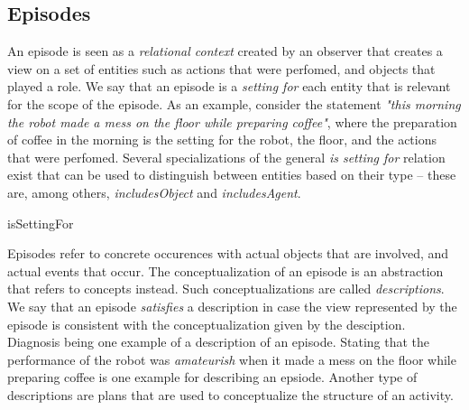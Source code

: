 \subsection{Episodes}
\label{sec:episodes}

An episode is seen as a \emph{relational context} created by an observer that creates a view on a set of entities such as actions that were perfomed, and objects that played a role. We say that an episode is a \emph{setting for} each entity that is relevant for the scope of the episode. As an example, consider the statement \emph{"this morning the robot made a mess on the floor while preparing coffee"}, where the preparation of coffee in the morning is the setting for the robot, the floor, and the actions that were perfomed.
Several specializations of the general \emph{is setting for} relation exist that can be used to distinguish between entities based on their type -- these are, among others, \emph{includesObject} and \emph{includesAgent}.

\begin{ODP}{isSettingFor}
\end{ODP}

Episodes refer to concrete occurences with actual objects that are involved, and actual events that occur.
The conceptualization of an episode is an abstraction that refers to concepts instead.
Such conceptualizations are called \emph{descriptions}.
We say that an episode \emph{satisfies} a description in case the view represented
by the episode is consistent with the conceptualization given by the desciption.
Diagnosis being one example of a description of an episode.
Stating that the performance of the robot was \emph{amateurish} when it made a mess on the floor while
preparing coffee is one example for describing an epsiode.
Another type of descriptions are plans that are used to conceptualize the structure of an activity.

